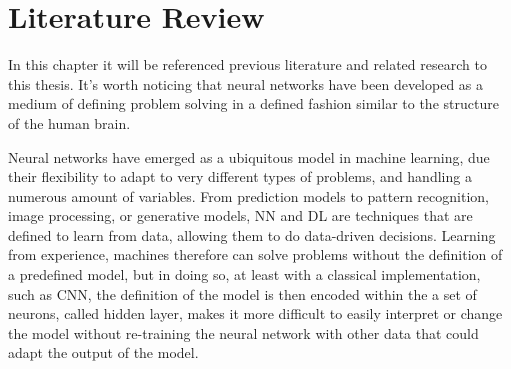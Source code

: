 \chapter{Literature Review} \label{chap:literature}

In this chapter it will be referenced previous literature and related research to this thesis.
It's worth noticing that neural networks have been developed as a medium of defining
problem solving in a defined fashion similar to the structure of the human brain.

Neural networks have emerged as a ubiquitous model in machine learning, due their flexibility 
to adapt to very different types of problems, and handling a numerous amount of variables.
From prediction models to pattern recognition, image processing, or generative models, NN and DL are
techniques that are defined to learn from data, allowing them to do data-driven decisions.
Learning from experience, machines therefore can solve problems without the definition
of a predefined model, but in doing so, at least with a classical implementation, such as
CNN, the definition of the model is then encoded within the a set of neurons, called hidden layer,
makes it more difficult to easily interpret or change the model without re-training the 
neural network with other data that could adapt the output of the model.


